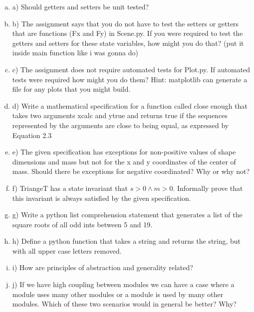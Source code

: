 \documentclass[12pt]{article}
\begin{document}
\begin{enumerate}[a)]

\item a) Should getters and setters be unit tested?




\item b) The assignment says that you do not have to test the setters or getters that are functions (Fx and Fy) in Scene.py. If you were required to test the getters and setters for these state variables, how might you do that? (put it inside main function like i was gonna do)




\item c) The assignment does not require automated tests for Plot.py. If automated tests were required how might you do them? Hint: matplotlib can generate a file for any plots that you might build.




\item d) Write a mathematical specification for a function called close enough that takes two arguments xcalc and ytrue and returns true if the sequences represented by the arguments are close to being equal, as expressed by Equation 2.3




\item e) The given specification has exceptions for non-positive values of shape dimensions and mass but not for the x and y coordinates of the center of mass. Should there be exceptions for negative coordinated? Why or why not?




\item f) TriangeT has a state invariant that $s > 0 \land m > 0$. Informally prove that this invariant is always satisfied by the given specification. 




\item g) Write a python list comprehension statement that generates a list of the square roots of all odd ints between 5 and 19.




\item h) Define a python function that takes a string and returns the string, but with all upper case letters removed.




\item i) How are principles of abstraction and generality related?




\item j) If we have high coupling between modules we can have a case where a module uses many other modules or a module is used by many other modules. Which of these two scenarios would in general be better? Why?




\end{enumerate}
\end{document}
